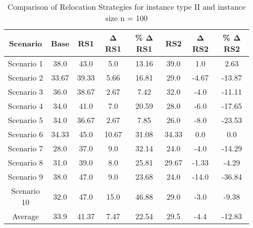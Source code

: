 \begin{table}[H]
\centering
\begin{tabular}{cccccccc}
  \hline
  \textbf{Scenario} & \textbf{Base} & \textbf{RS1} & \textbf{Δ RS1} & \textbf{\% Δ RS1} & \textbf{RS2} & \textbf{Δ RS2} & \textbf{\% Δ RS2} \\\hline
  Scenario 1 & 38.0 & 43.0 & 5.0 & 13.16 & 39.0 & 1.0 & 2.63 \\
  Scenario 2 & 33.67 & 39.33 & 5.66 & 16.81 & 29.0 & -4.67 & -13.87 \\
  Scenario 3 & 36.0 & 38.67 & 2.67 & 7.42 & 32.0 & -4.0 & -11.11 \\
  Scenario 4 & 34.0 & 41.0 & 7.0 & 20.59 & 28.0 & -6.0 & -17.65 \\
  Scenario 5 & 34.0 & 36.67 & 2.67 & 7.85 & 26.0 & -8.0 & -23.53 \\
  Scenario 6 & 34.33 & 45.0 & 10.67 & 31.08 & 34.33 & 0.0 & 0.0 \\
  Scenario 7 & 28.0 & 37.0 & 9.0 & 32.14 & 24.0 & -4.0 & -14.29 \\
  Scenario 8 & 31.0 & 39.0 & 8.0 & 25.81 & 29.67 & -1.33 & -4.29 \\
  Scenario 9 & 38.0 & 47.0 & 9.0 & 23.68 & 24.0 & -14.0 & -36.84 \\
  Scenario 10 & 32.0 & 47.0 & 15.0 & 46.88 & 29.0 & -3.0 & -9.38 \\
  Average & 33.9 & 41.37 & 7.47 & 22.54 & 29.5 & -4.4 & -12.83 \\\hline
\end{tabular}
\caption{Comparison of Relocation Strategies for instance type II and instance size n = 100}
\label{tab:wait:resrelocation-comparison_II_100}
\end{table}
